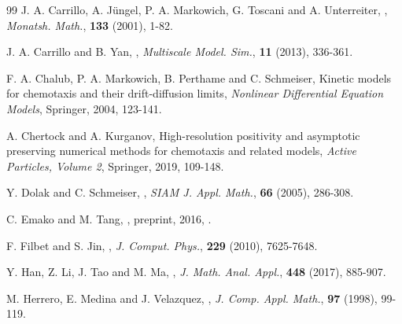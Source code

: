\documentclass{aims} %
\theoremstyle{definition}
\begin{document}
{\begin{thebibliography}{99}
\newblock J. A. Carrillo, A. J{\"u}ngel, P. A. Markowich, G. Toscani and A. Unterreiter, 
\newblock {},
\newblock \emph{Monatsh. Math.}, \textbf{133} (2001), 1-82.

\newblock J. A. Carrillo and B. Yan, 
\newblock {},
\newblock \emph{Multiscale Model. Sim.}, \textbf{11} (2013), 336-361.

\newblock F. A. Chalub, P. A. Markowich, B. Perthame and C. Schmeiser, 
\newblock Kinetic models for chemotaxis and their drift-diffusion limits,
\newblock \emph{Nonlinear Differential Equation Models},  Springer, 2004, 123-141.

\newblock A. Chertock and A. Kurganov, 
\newblock High-resolution positivity and asymptotic preserving numerical methods for chemotaxis and related models,
\newblock \emph{Active Particles, Volume 2},  Springer, 2019, 109-148. 

\newblock Y. Dolak and C. Schmeiser,   
\newblock {},
\newblock \emph{SIAM J. Appl. Math.}, \textbf{66} (2005), 286-308.

\newblock C. Emako and M. Tang,   
\newblock {},
\newblock preprint, 2016, .

\newblock F. Filbet and S. Jin,   
\newblock {},
\newblock \emph{J. Comput. Phys.}, \textbf{229} (2010), 7625-7648.

\newblock Y. Han, Z. Li, J. Tao and M. Ma,    
\newblock {},
\newblock \emph{J. Math. Anal. Appl.}, \textbf{448} (2017), 885-907.

\newblock M. Herrero, E. Medina and J. Velazquez, 
\newblock {},
\newblock \emph{J. Comp. Appl. Math.}, \textbf{97} (1998), 99-119.


\end{thebibliography}}
\end{document}
